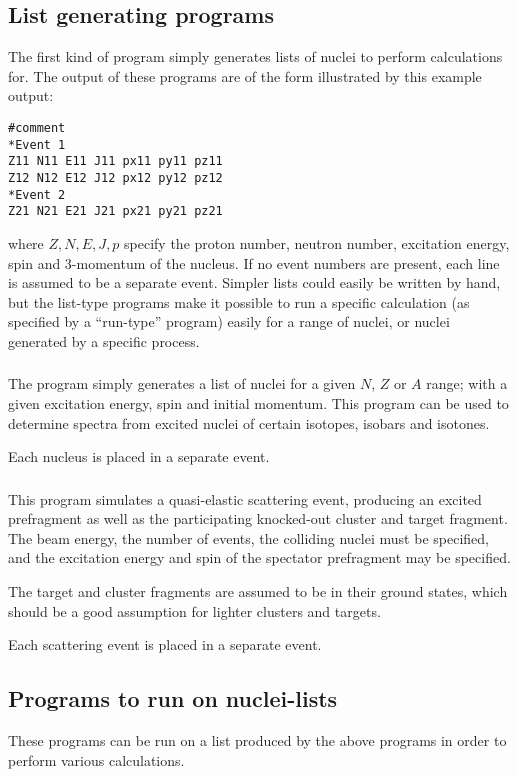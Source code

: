\subsection{List generating programs}
The first kind of program simply generates lists of nuclei to perform calculations for. The output of these programs are of the form illustrated by this example output:
\begin{lstlisting}
#comment
*Event 1
Z11 N11 E11 J11 px11 py11 pz11
Z12 N12 E12 J12 px12 py12 pz12
*Event 2
Z21 N21 E21 J21 px21 py21 pz21
\end{lstlisting}
where $Z,N,E,J,p$ specify the proton number, neutron number, excitation energy, spin and 3-momentum of the nucleus. If no event numbers are present, each line is assumed to be a separate event. Simpler lists could easily be written by hand, but the list-type programs make it possible to run a specific calculation (as specified by a ``run-type'' program) easily for a range of nuclei, or nuclei generated by a specific process.

\subsubsection{}
The  program simply generates a list of nuclei for a given $N$, $Z$ or $A$ range; with a given excitation energy, spin and initial momentum. This program can be used to determine spectra from excited nuclei of certain isotopes, isobars and isotones.

Each nucleus is placed in a separate event.

\subsubsection{}
This program simulates a quasi-elastic scattering event, producing an excited prefragment as well as the participating knocked-out cluster and target fragment.
The beam energy, the number of events, the colliding nuclei must be specified, and the excitation energy and spin of the spectator prefragment may be specified.

The target and cluster fragments are assumed to be in their ground states, which should be a good assumption for lighter clusters and targets.

Each scattering event is placed in a separate event.

\subsection{Programs to run on nuclei-lists}
These programs can be run on a list produced by the above programs in order to perform various calculations. 

